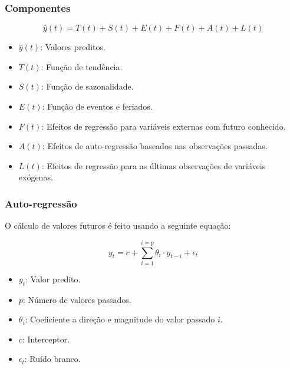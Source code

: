 \documentclass{beamer}
\begin{document}
\begin{frame}
\frametitle{Componentes}
\begin{equation}
    \hat{y}(t) = T(t) + S(t) + E(t) + F(t) + A(t) + L(t)
\end{equation}
\begin{itemize}
    \item $\hat{y}(t)$: Valores preditos.
    \item $T(t)$: Função de tendência.
    \item $S(t)$: Função de sazonalidade.
    \item $E(t)$: Função de eventos e feriados.
    \item $F(t)$: Efeitos de regressão para variáveis externas com futuro conhecido.
    \item $A(t)$: Efeitos de auto-regressão baseados nas observações passadas.
    \item $L(t)$: Efeitos de regressão para as últimas observações de variáveis exógenas.
\end{itemize}
\end{frame}


\begin{frame}
\frametitle{Auto-regressão}
O cálculo de valores futuros é feito usando a seguinte equação:

\begin{equation}
    y_t = c + \sum_{i=1}^{i=p} \theta_i \cdot y_{t-i} + \epsilon_t
\end{equation}
\begin{itemize}
    \item $y_t$: Valor predito.
    \item $p$: Número de valores passados.
    \item $\theta_i$: Coeficiente a direção e magnitude do valor passado $i$.
    \item $c$: Interceptor.
    \item $\epsilon_t$: Ruído branco.
\end{itemize}
\end{frame}
\end{document}
